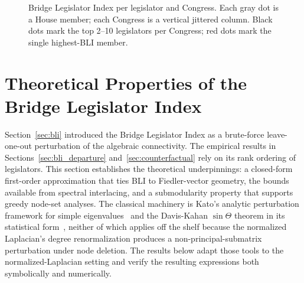 \documentclass[12pt, a4paper]{article}
\begin{document}
\begin{figure}[H]
\caption{Bridge Legislator Index per legislator and Congress. Each gray dot is a House member; each Congress is a vertical jittered column. Black dots mark the top 2--10 legislators per Congress; red dots mark the single highest-BLI member.}
\label{fig:bli_time}
\end{figure}

\FloatBarrier
\section{Theoretical Properties of the Bridge Legislator Index}\label{sec:bli_theorem}

Section~\ref{sec:bli} introduced the Bridge Legislator Index as a brute-force leave-one-out perturbation of the algebraic connectivity. The empirical results in Sections~\ref{sec:bli_departure} and~\ref{sec:counterfactual} rely on its rank ordering of legislators. This section establishes the theoretical underpinnings: a closed-form first-order approximation that ties BLI to Fiedler-vector geometry, the bounds available from spectral interlacing, and a submodularity property that supports greedy node-set analyses. The classical machinery is Kato's analytic perturbation framework for simple eigenvalues~\citep{kato1995perturbation} and the Davis-Kahan $\sin\Theta$ theorem in its statistical form~\citep{yu2015useful}, neither of which applies off the shelf because the normalized Laplacian's degree renormalization produces a non-principal-submatrix perturbation under node deletion. The results below adapt those tools to the normalized-Laplacian setting and verify the resulting expressions both symbolically and numerically.
\end{document}
